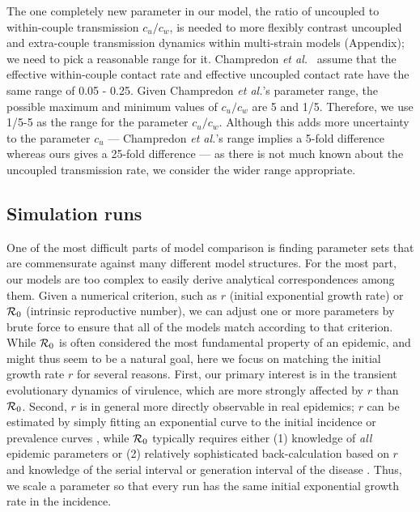 \documentclass[10pt,letterpaper]{article}
\newcommand{\etal}{\textit{et al.}}
\begin{document}
The one completely new parameter in our model, the ratio of uncoupled to within-couple transmission $c_u/c_w$, is needed to more flexibly contrast uncoupled and extra-couple transmission dynamics within multi-strain models (Appendix); we need to pick a reasonable range for it. Champredon \etal\ \cite{champredon_hiv_2013} assume that the effective within-couple contact rate and effective uncoupled contact rate have the same range of 0.05 - 0.25.  Given Champredon \etal's parameter range, the possible maximum and minimum values of $c_u/c_w$ are 5 and 1/5. Therefore, we use 1/5-5 as the range for the parameter $c_u/c_w$. Although this adds more uncertainty to the parameter $c_u$ --- Champredon \etal's range implies a 5-fold difference whereas ours gives a 25-fold difference --- as there is not much known about the uncoupled transmission rate, we consider the wider range appropriate.


\subsection*{Simulation runs}

One of the most difficult parts of model comparison is finding parameter sets that are commensurate against many different model structures. For the most part, our models are too complex to easily derive analytical correspondences among them. Given a numerical criterion, such as $r$ (initial exponential growth rate) or ${\cal R}_0$ (intrinsic reproductive number), we can adjust one or more parameters by brute force to ensure that all of the models match according to that criterion. While ${\cal R}_0$ is often considered the most fundamental property of an epidemic, and might thus seem to be a natural goal, here we focus on matching the initial growth rate $r$ for several reasons. First, our primary interest is in the transient evolutionary dynamics of virulence, which are more strongly affected by $r$ than ${\cal R}_0$. Second, $r$ is in general more directly observable in real epidemics; $r$ can be estimated by simply fitting an exponential curve to the initial incidence or prevalence curves \cite{ma_estimating_2014}, while ${\cal R}_0$ typically requires either (1) knowledge of \emph{all} epidemic parameters or (2) relatively sophisticated back-calculation based on $r$ and knowledge of the serial interval or generation interval of the disease \cite{wallinga_how_2007}. Thus, we scale a parameter so that every run has the same initial exponential growth rate in the incidence.
\end{document}
